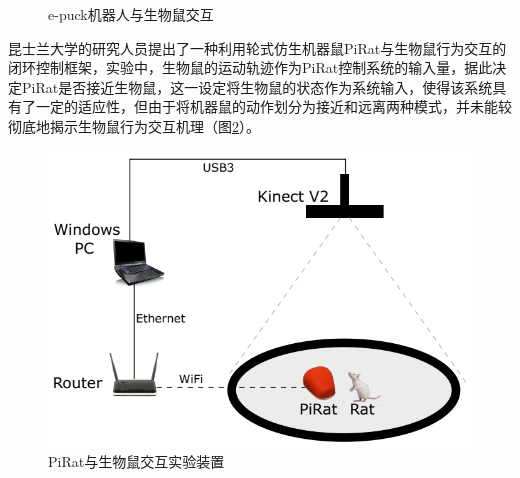 \begin{figure}[htb]
{  }
  \caption{e-puck机器人与生物鼠交互\cite{delangelortizSocialInteractionTest2016}} \label{figure_epuck}
\end{figure}

昆士兰大学的研究人员提出了一种利用轮式仿生机器鼠PiRat与生物鼠行为交互的闭环控制框架，实验中，生物鼠的运动轨迹作为PiRat控制系统的输入量，据此决定PiRat是否接近生物鼠，这一设定将生物鼠的状态作为系统输入，使得该系统具有了一定的适应性，但由于将机器鼠的动作划分为接近和远离两种模式，并未能较彻底地揭示生物鼠行为交互机理（图\ref{figure_pirat_interact}）\cite{heathPiRatAutonomousFramework2018}。
\begin{figure}[htb]
  \centering
  \includegraphics[width=0.5\linewidth]{images/ch01/piratintera.png}
  \caption{PiRat与生物鼠交互实验装置\cite{heathPiRatAutonomousFramework2018}}\label{figure_pirat_interact}
\end{figure}

